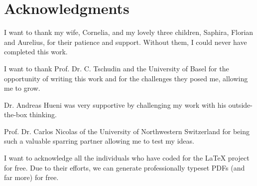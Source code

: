 \section*{\abstractname}   
\myabstract

\vspace*{\fill}

\section*{Acknowledgments}
I want to thank my wife, Cornelia, and my lovely three children, Saphira, Florian and Aurelius, for their patience and support. Without them, I could never have completed this work.

I want to thank Prof. Dr. C. Tschudin and the University of Basel for the opportunity of writing this work and for the challenges they posed me, allowing me to grow. 

Dr. Andreas Hueni was very supportive by challenging my work with his outside-the-box thinking.

Prof. Dr. Carlos Nicolas of the University of Northwestern Switzerland for being such a valuable sparring partner allowing me to test my ideas.

I want to acknowledge all the individuals who have coded for the \LaTeX{} project for free. Due to their efforts, we can generate professionally typeset PDFs (and far more) for free.






